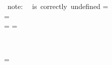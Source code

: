 \begin{MDefinition}{\GuessType\varEnv\e
\quad 
\mbox{ note: }\!\!\GuessType\varEnv{\Cb{\es_\vI\catch_\vI\ldots\es_\vn\catch_\vn}}
\!\mbox{ is correctly undefined}
}
\GuessType\varEnv{
\e\oSquare\ps_\vI\semicolon\ldots\,\ps_\vn\semicolon\cSquare
}=
\GuessType\varEnv{\e\Mc\fApply{}
\Mc\itAdd{\ps_\vI}
\ldots
\Mc\itAdd{\ps_\vn}}\\

\GuessType\varEnv{\e\oSquare\with\Opt\block\cSquare}=
\GuessType\varEnv{\e\Mc\fApply{}}\\
\GuessType\varEnv{\e\,\docs}=
\GuessType\varEnv{\Using\Path{\Mh\m{\docs\,\ps}}\e}
=\GuessType\varEnv{\e}\\
\end{MDefinition}

\\
\begin{MDefinition}
  {\CFType{\mdf\,\Mh\m{\V{\f_\vI}\ldots\V{\f_\vn}}}=\Many\mhT
}
\in
{}
\\

  \mhTt{\SMdf}{\x}{ \ft{}{\thatKw}{\mdf\, \Path} }{\IMdf\, \VoidKw}{\emptyset}\in
 \CFType{\_\,\Mh\m{\V{\Many\f_\vI}\,\ft{\varKw}{\x}{\mdf \Path}\,\V{\Many\f_\vII}}}
\\
 \mhTt{\SMdf}{\x}{ \ft{}{\thatKw}{\Path\Many{\mx}} }{\IMdf\, \VoidKw}{\emptyset}\in
 \CFType{\_\,\Mh\m{\V{\Many\f_\vI}\,\ft{\varKw}{\x}{\Path\Many{\mx}}\,\V{\Many\f_\vII}}}
\\

 \mhTt{\SMdf}{\hash\x}{}{\T}{\emptyset}
\in
 \CFType{\_\,\Mh\m{\V{\Many\f_\vI}\,\ft{\varOpt}{\x}{\T}\,\V{\Many\f_\vII}}}
\\


\mhTt{\RMdf}{\x}{}{\mutableAndLentToReadable(\Type\mdf\Path{})}{\emptyset}
\in
 \CFType{\_\,\Mh\m{\Many\f_\vI\,\ft{\varOpt}{\x}{\Type\mdf\Path{}}\,\Many\f_\vII}}
\end{MDefinition}

